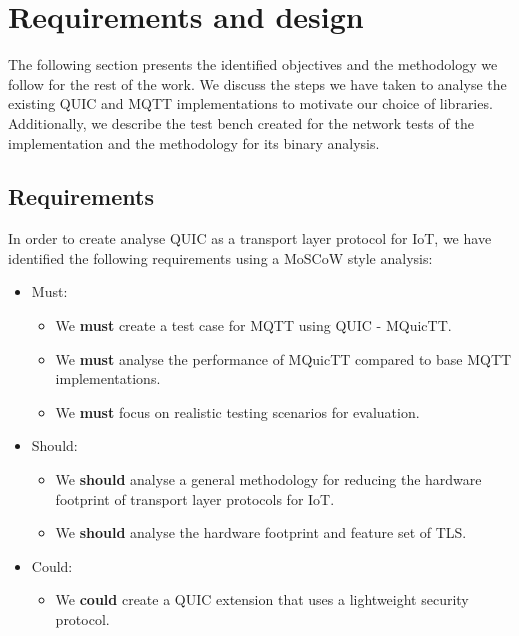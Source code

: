 \chapter{Requirements and design} \label{chap:reqs}

The following section presents the identified objectives and the methodology we follow for the rest of the work.
We discuss the steps we have taken to analyse the existing QUIC and MQTT implementations to motivate our choice of libraries.
Additionally, we describe the test bench created for the network tests of the implementation and the methodology for its binary analysis.



\section{Requirements}

In order to create analyse QUIC as a transport layer protocol for IoT, we have identified the following requirements using a MoSCoW style analysis:

\begin{itemize}
    \item Must:
    \begin{itemize}
        \item We \textbf{must} create a test case for MQTT using QUIC - MQuicTT.
        \item We \textbf{must} analyse the performance of MQuicTT compared to base MQTT implementations.
        \item We \textbf{must} focus on realistic testing scenarios for evaluation.
    \end{itemize}
    \item Should:
    \begin{itemize}
        \item We \textbf{should} analyse a general methodology for reducing the hardware footprint of transport layer protocols for IoT.
        \item We \textbf{should} analyse the hardware footprint and feature set of TLS.
    \end{itemize}
    \item Could:
    \begin{itemize}
        \item We \textbf{could} create a QUIC extension that uses a lightweight security protocol.
    \end{itemize}
\end{itemize}

